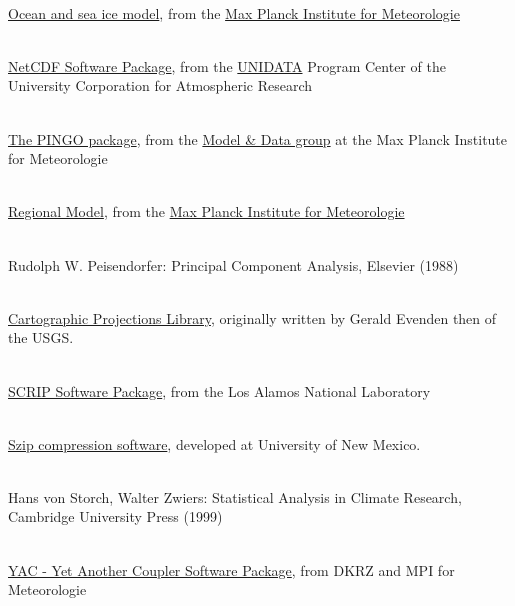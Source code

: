\begin{thebibliography}{xx}
 \ \\
  \href{http://www.mpimet.mpg.de/en/wissenschaft/modelle/mpiom/mpiom-description.html}
       {Ocean and sea ice model},
  from the
  \href{http://www.mpimet.mpg.de}
       {Max Planck Institute for Meteorologie}


 \ \\
  \href{https://www.unidata.ucar.edu/software/netcdf}{NetCDF Software Package},
  from the
  \href{https://www.unidata.ucar.edu}{UNIDATA}
  Program Center of the University Corporation for Atmospheric Research


 \ \\
  \href{http://www.mad.zmaw.de/Pingo/post/down/BigPingo.pdf}{The PINGO package},
  from the
  \href{http://www.mad.zmaw.de}{Model \& Data group}
  at the Max Planck Institute for Meteorologie


 \ \\
  \href{http://www.remo-rcm.de/}{Regional Model},
  from the
  \href{http://www.mpimet.mpg.de}
       {Max Planck Institute for Meteorologie}


 \ \\
  Rudolph W. Peisendorfer: Principal Component Analysis, Elsevier (1988)


 \ \\
  \href{https://github.com/OSGeo/proj.4/wiki}{Cartographic Projections Library},
  originally written by Gerald Evenden then of the USGS.


 \ \\
  \href{http://oceans11.lanl.gov/trac/SCRIP}{SCRIP Software Package},
  from the Los Alamos National Laboratory


 \ \\
  \href{http://www.hdfgroup.org/doc_resource/SZIP}{Szip compression software},
  developed at University of New Mexico.


 \ \\
  Hans von Storch, Walter Zwiers: Statistical Analysis in Climate Research, Cambridge University Press (1999)


 \ \\
  \href{https://doc.redmine.dkrz.de/YAC/html}{YAC - Yet Another Coupler Software Package},
  from DKRZ and MPI for Meteorologie

\end{thebibliography}

